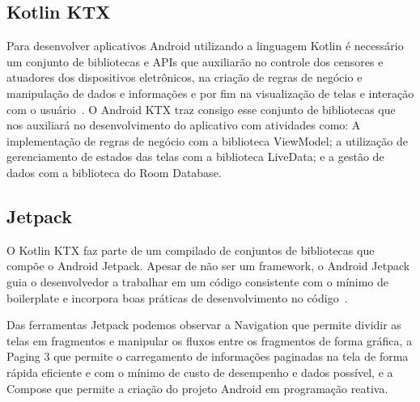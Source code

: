 \subsection{Kotlin KTX}\label{subsec:kotlin-ktx}

Para desenvolver aplicativos Android utilizando a linguagem Kotlin é necessário um conjunto de bibliotecas e APIs que auxiliarão no controle dos censores e atuadores dos dispositivos eletrônicos, na criação de regras de negócio e manipulação de dados e informações e por fim na visualização de telas e interação com o usuário~\cite{ktx}.
O Android KTX traz consigo esse conjunto de bibliotecas que nos auxiliará no desenvolvimento do aplicativo com atividades como: A implementação de regras de negócio com a biblioteca ViewModel; a utilização de gerenciamento de estados das telas com a biblioteca LiveData; e a gestão de dados com a biblioteca do Room Database.

\subsection{Jetpack}\label{subsec:jetpack}

O Kotlin KTX faz parte de um compilado de conjuntos de bibliotecas que compõe o Android Jetpack.
Apesar de não ser um framework, o Android Jetpack guia o desenvolvedor a trabalhar em um código consistente com o mínimo de boilerplate e incorpora boas práticas de desenvolvimento no código~\cite{jetpack}.

Das ferramentas Jetpack podemos observar a Navigation que permite dividir as telas em fragmentos e manipular os fluxos entre os fragmentos de forma gráfica, a Paging 3 que permite o carregamento de informações paginadas na tela de forma rápida eficiente e com o mínimo de custo de desempenho e dados possível, e a Compose que permite a criação do projeto Android em programação reativa.